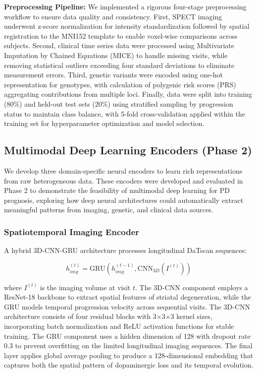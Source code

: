 \documentclass[conference]{IEEEtran}
\begin{document}
\textbf{Preprocessing Pipeline:} We implemented a rigorous four-stage preprocessing workflow to ensure data quality and consistency. First, SPECT imaging underwent z-score normalization for intensity standardization followed by spatial registration to the MNI152 template to enable voxel-wise comparisons across subjects. Second, clinical time series data were processed using Multivariate Imputation by Chained Equations (MICE) to handle missing visits, while removing statistical outliers exceeding four standard deviations to eliminate measurement errors. Third, genetic variants were encoded using one-hot representation for genotypes, with calculation of polygenic risk scores (PRS) aggregating contributions from multiple loci. Finally, data were split into training (80\%) and held-out test sets (20\%) using stratified sampling by progression status to maintain class balance, with 5-fold cross-validation applied within the training set for hyperparameter optimization and model selection.

\subsection{Multimodal Deep Learning Encoders (Phase 2)}

We develop three domain-specific neural encoders to learn rich representations from raw heterogeneous data. These encoders were developed and evaluated in Phase 2 to demonstrate the feasibility of multimodal deep learning for PD prognosis, exploring how deep neural architectures could automatically extract meaningful patterns from imaging, genetic, and clinical data sources.

\subsubsection{Spatiotemporal Imaging Encoder}
A hybrid 3D-CNN-GRU architecture processes longitudinal DaTscan sequences:

\begin{equation}
h_{img}^{(t)} = \text{GRU}(h_{img}^{(t-1)}, \text{CNN}_{3D}(I^{(t)}))
\end{equation}

where $I^{(t)}$ is the imaging volume at visit $t$. The 3D-CNN component employs a ResNet-18 backbone to extract spatial features of striatal degeneration, while the GRU models temporal progression velocity across sequential visits. The 3D-CNN architecture consists of four residual blocks with 3×3×3 kernel sizes, incorporating batch normalization and ReLU activation functions for stable training. The GRU component uses a hidden dimension of 128 with dropout rate 0.3 to prevent overfitting on the limited longitudinal imaging sequences. The final layer applies global average pooling to produce a 128-dimensional embedding that captures both the spatial pattern of dopaminergic loss and its temporal evolution.
\end{document}
